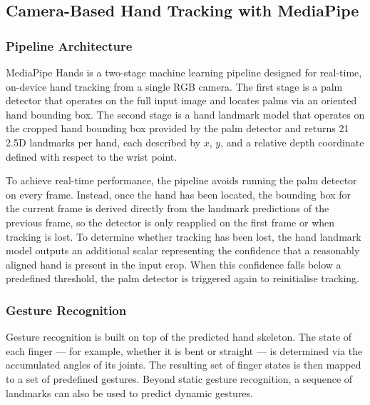 \subsection{Camera-Based Hand Tracking with MediaPipe}
\label{subsec:mediapipe}

\subsubsection{Pipeline Architecture}
MediaPipe Hands \cite{zhang2020mediapipehands} is a two-stage machine learning
pipeline designed for real-time, on-device hand tracking from a single RGB camera.
The first stage is a palm detector that operates on the full input image and locates
palms via an oriented hand bounding box. The second stage is a hand landmark model
that operates on the cropped hand bounding box provided by the palm detector and
returns 21 2.5D landmarks per hand, each described by $x$, $y$, and a relative
depth coordinate defined with respect to the wrist point.

To achieve real-time performance, the pipeline avoids running the palm detector on
every frame. Instead, once the hand has been located, the bounding box for the
current frame is derived directly from the landmark predictions of the previous
frame, so the detector is only reapplied on the first frame or when tracking is
lost. To determine whether tracking has been lost, the hand landmark model outputs
an additional scalar representing the confidence that a reasonably aligned hand is
present in the input crop. When this confidence falls below a predefined threshold,
the palm detector is triggered again to reinitialise tracking.

\subsubsection{Gesture Recognition}
Gesture recognition is built on top of the predicted hand skeleton. The state of
each finger --- for example, whether it is bent or straight --- is determined via
the accumulated angles of its joints. The resulting set of finger states is then
mapped to a set of predefined gestures. Beyond static gesture recognition, a
sequence of landmarks can also be used to predict dynamic gestures.
